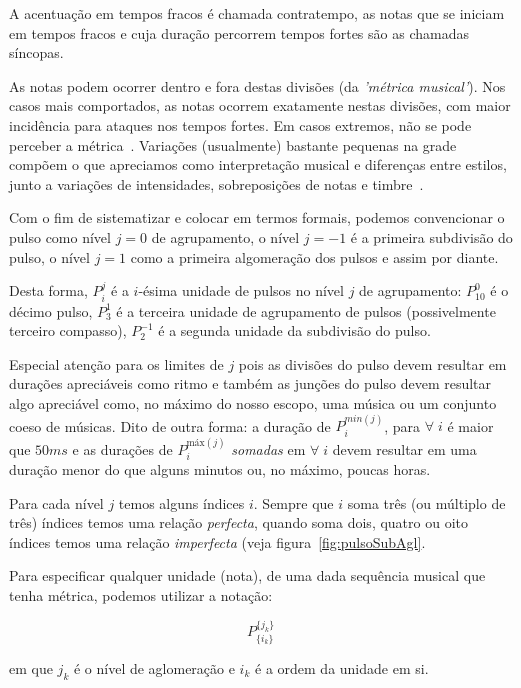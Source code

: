 A acentuação em tempos fracos é chamada contratempo, as notas que se iniciam em tempos fracos e cuja duração percorrem tempos fortes são as chamadas síncopas.

As notas podem ocorrer dentro e fora destas divisões (da \emph{'métrica musical'}). Nos casos mais comportados, as notas ocorrem exatamente nestas divisões, com maior incidência para ataques nos tempos fortes.
Em casos extremos, não se pode perceber a métrica~\cite{Roederer}. Variações (usualmente) bastante pequenas na grade compõem o que apreciamos como interpretação musical e diferenças entre estilos, junto a variações de intensidades, sobreposições de notas e timbre~\cite{Cook}.

Com o fim de sistematizar e colocar em termos formais, podemos convencionar
o pulso como nível $j=0$ de agrupamento, o nível $j=-1$ 
é a primeira subdivisão do pulso, o nível $j=1$ como a primeira algomeração dos pulsos e assim por diante. 

Desta forma, $P_i^j$ é a $i$-ésima unidade de 
pulsos no nível $j$ de agrupamento:
$P^0_{10}$ é o décimo pulso, $P^{1}_3$ é a terceira unidade de agrupamento de pulsos (possivelmente terceiro compasso),
$P^{-1}_2$ é a segunda unidade da subdivisão do pulso.

Especial atenção para
os limites de $j$ pois as divisões do pulso devem resultar em durações apreciáveis
como ritmo e também as junções do pulso devem resultar algo apreciável como, no máximo
do nosso escopo, uma música ou um conjunto coeso de músicas. Dito de outra forma: a duração de $P^{min(j)}_i$, para $\forall \; i$
é maior que $50ms$ e as durações de $P^{\text{máx}(j)}_i$ \emph{somadas}  em $\forall \; i$
devem resultar em uma duração menor do que alguns minutos ou, no máximo, poucas horas.


Para cada nível $j$ temos alguns índices $i$. Sempre que $i$ soma três 
(ou múltiplo de três) índices temos uma relação \emph{perfecta}, 
quando soma dois, quatro ou oito índices temos uma relação \emph{imperfecta} (veja figura~\ref{fig:pulsoSubAgl}.


Para especificar qualquer unidade (nota), de uma
dada sequência musical que tenha métrica,
podemos utilizar a notação:

\begin{equation}
P^{ \{ j_k \} }_{ \{ i_{k} \}}
\end{equation}

em que $j_k$ é o nível de aglomeração e $i_k$ é a ordem
da unidade em si.

